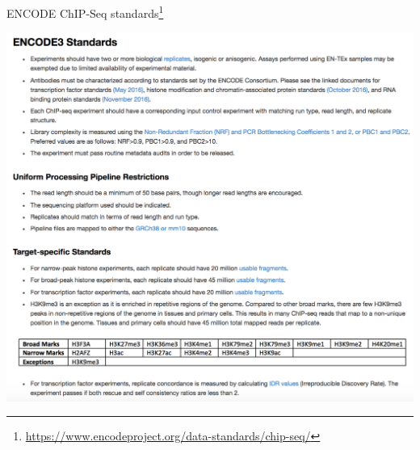 \documentclass{beamer}
\begin{document}
\begin{frame}{ENCODE ChIP-Seq standards\footnote{\url{https://www.encodeproject.org/data-standards/chip-seq/}}}
\begin{center}
\includegraphics[height=0.8\paperheight]{encode3_standards.png}
\end{center}
\end{frame}
\end{document}
